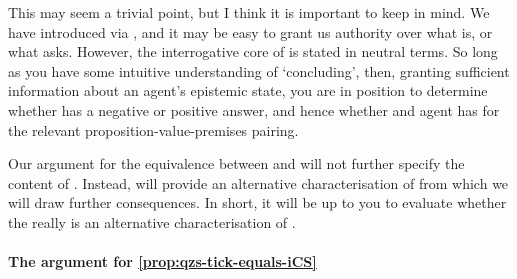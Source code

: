 \begin{note}[Intuition]
  This may seem a trivial point, but I think it is important to keep in mind.
  We have introduced \zS{} via \qzS{}, and it may be easy to grant us authority over what \zS{} is, or what \qzS{} asks.
  However, the interrogative core of \qzS{} is stated in neutral terms.
  So long as you have some intuitive understanding of `concluding', then, granting sufficient information about an agent's epistemic state, you are in position to determine whether \qzS{} has a negative or positive answer, and hence whether and agent has \zS{} for the relevant proposition-value-premises pairing.

  Our argument for the equivalence between \zS{} and \zetaS{} will not further specify the content of \qzS{}.
  Instead, \zetaS{} will provide an alternative characterisation of \zS{} from which we will draw further consequences.
  In short, it will be up to you to evaluate whether the \zetaS{} really is an alternative characterisation of \zS{}.
\end{note}

\paragraph*{The argument for \autoref{prop:qzs-tick-equals-iCS}}

